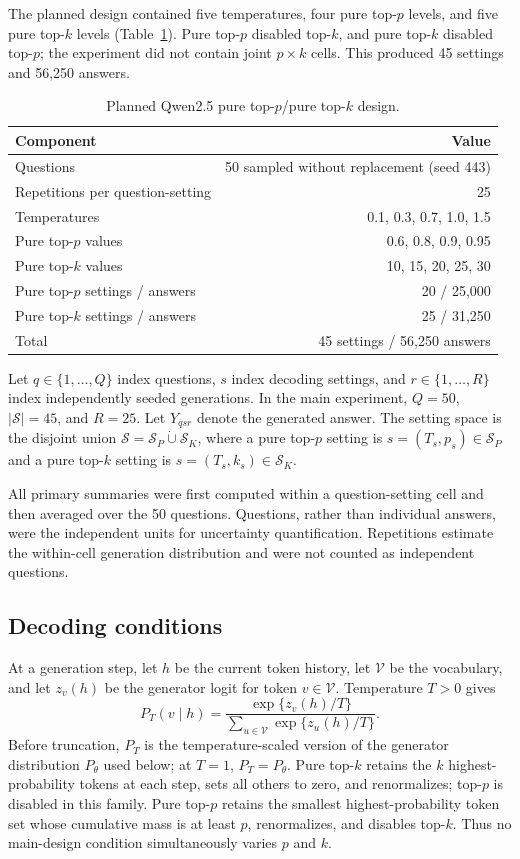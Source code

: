 \documentclass[11pt]{article}
\begin{document}
The planned design contained five temperatures, four pure top-$p$ levels, and
five pure top-$k$ levels (Table~\ref{tab:design}). Pure top-$p$ disabled top-$k$,
and pure top-$k$ disabled top-$p$; the experiment did not contain joint
$p\times k$ cells. This produced 45 settings and 56,250 answers.

\begin{table}[ht]
\centering
\caption{Planned Qwen2.5 pure top-$p$/pure top-$k$ design.}
\label{tab:design}
\begin{tabular}{lr}
\toprule
Component & Value \\
\midrule
Questions & 50 sampled without replacement (seed 443) \\
Repetitions per question-setting & 25 \\
Temperatures & 0.1, 0.3, 0.7, 1.0, 1.5 \\
Pure top-$p$ values & 0.6, 0.8, 0.9, 0.95 \\
Pure top-$k$ values & 10, 15, 20, 25, 30 \\
Pure top-$p$ settings / answers & 20 / 25,000 \\
Pure top-$k$ settings / answers & 25 / 31,250 \\
Total & 45 settings / 56,250 answers \\
\bottomrule
\end{tabular}
\end{table}

Let $q\in\{1,\ldots,Q\}$ index questions, $s$ index decoding settings, and
$r\in\{1,\ldots,R\}$ index independently seeded generations. In the main
experiment, $Q=50$, $|\mathcal S|=45$, and $R=25$. Let $Y_{qsr}$ denote the generated
answer. The setting space is the disjoint union
$\mathcal S=\mathcal S_P\mathbin{\dot\cup}\mathcal S_K$, where a pure top-$p$ setting is
$s=(T_s,p_s)\in\mathcal S_P$ and a pure top-$k$ setting is
$s=(T_s,k_s)\in\mathcal S_K$.

All primary summaries were first computed within a question-setting cell and
then averaged over the 50 questions. Questions, rather than individual answers,
were the independent units for uncertainty quantification. Repetitions estimate
the within-cell generation distribution and were not counted as independent
questions.

\subsection{Decoding conditions}

At a generation step, let $h$ be the current token history, let $\mathcal V$
be the vocabulary, and let $z_v(h)$ be the generator logit for token
$v\in\mathcal V$. Temperature $T>0$ gives
\[
 P_T(v\mid h)=
 \frac{\exp\{z_v(h)/T\}}
 {\sum_{u\in\mathcal V}\exp\{z_u(h)/T\}}.
\]
Before truncation, $P_T$ is the temperature-scaled version of the generator
distribution $P_\theta$ used below; at $T=1$, $P_T=P_\theta$.
Pure top-$k$ retains the $k$ highest-probability tokens at each step, sets all
others to zero, and renormalizes; top-$p$ is disabled in this family. Pure
top-$p$ retains the smallest highest-probability token set whose cumulative
mass is at least $p$, renormalizes, and disables top-$k$. Thus no main-design
condition simultaneously varies $p$ and $k$.
\end{document}
